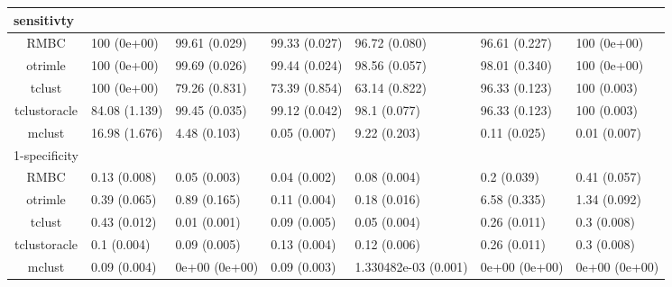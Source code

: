 \begin{longtable}{cllllll}
\midrule
\multicolumn{1}{l}{sensitivty} \\ 
\midrule
RMBC & 100 (0e+00) & 99.61 (0.029) & 99.33 (0.027) & 96.72 (0.080) & 96.61 (0.227) & 100 (0e+00) \\ 
otrimle & 100 (0e+00) & 99.69 (0.026) & 99.44 (0.024) & 98.56 (0.057) & 98.01 (0.340) & 100 (0e+00) \\ 
tclust & 100 (0e+00) & 79.26 (0.831) & 73.39 (0.854) & 63.14 (0.822) & 96.33 (0.123) & 100 (0.003) \\ 
tclustoracle & 84.08 (1.139) & 99.45 (0.035) & 99.12 (0.042) & 98.1 (0.077) & 96.33 (0.123) & 100 (0.003) \\ 
mclust & 16.98 (1.676) & 4.48 (0.103) & 0.05 (0.007) & 9.22 (0.203) & 0.11 (0.025) & 0.01 (0.007) \\ 
\midrule
\multicolumn{1}{l}{1-specificity} \\ 
\midrule
RMBC & 0.13 (0.008) & 0.05 (0.003) & 0.04 (0.002) & 0.08 (0.004) & 0.2 (0.039) & 0.41 (0.057) \\ 
otrimle & 0.39 (0.065) & 0.89 (0.165) & 0.11 (0.004) & 0.18 (0.016) & 6.58 (0.335) & 1.34 (0.092) \\ 
tclust & 0.43 (0.012) & 0.01 (0.001) & 0.09 (0.005) & 0.05 (0.004) & 0.26 (0.011) & 0.3 (0.008) \\ 
tclustoracle & 0.1 (0.004) & 0.09 (0.005) & 0.13 (0.004) & 0.12 (0.006) & 0.26 (0.011) & 0.3 (0.008) \\ 
mclust & 0.09 (0.004) & 0e+00 (0e+00) & 0.09 (0.003) & 1.330482e-03 (0.001) & 0e+00 (0e+00) & 0e+00 (0e+00) \\ 
\bottomrule
\end{longtable}

